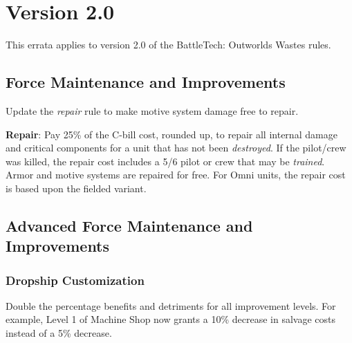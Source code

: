 \section{Version 2.0}

This errata applies to version 2.0 of the BattleTech: Outworlds Wastes rules.

\subsection{Force Maintenance and Improvements}

Update the \emph{repair} rule to make motive system damage free to repair.

\begin{description}

\item {\bfseries Repair}: Pay 25\% of the C-bill cost, rounded up, to repair all internal damage and critical components for a unit that has not been \emph{destroyed}.
If the pilot/crew was killed, the repair cost includes a 5/6 pilot or crew that may be \emph{trained}.
Armor and motive systems are repaired for free.
For Omni units, the repair cost is based upon the fielded variant.

\end{description}

\subsection{Advanced Force Maintenance and Improvements}

\subsubsection{Dropship Customization}

Double the percentage benefits and detriments for all improvement levels.
For example, Level 1 of Machine Shop now grants a 10\% decrease in salvage costs instead of a 5\% decrease.
